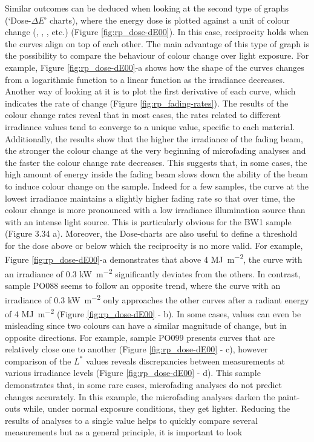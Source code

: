 Similar outcomes can be deduced when looking at the second type of graphs (‘Dose-$\Delta E$’ charts), where the energy dose is plotted against a unit of colour change (\dEOO, \dEab, \dR, etc.) (Figure \ref{fig:rp_dose-dE00}). In this case, reciprocity holds when the curves align on top of each other. The main advantage of this type of graph is the possibility to compare the behaviour of colour change over light exposure. For example, Figure \ref{fig:rp_dose-dE00}-a shows how the shape of the curves changes from a logarithmic function to a linear function as the irradiance decreases. Another way of looking at it is to plot the first derivative of each curve, which indicates the rate of change (Figure \ref{fig:rp_fading-rates}). The results of the colour change rates reveal that in most cases, the rates related to different irradiance values tend to converge to a unique value, specific to each material. Additionally, the results show that the higher the irradiance of the fading beam, the stronger the colour change at the very beginning of microfading analyses and the faster the colour change rate decreases. This suggests that, in some cases, the high amount of energy inside the fading beam slows down the ability of the beam to induce colour change on the sample. Indeed for a few samples, the curve at the lowest irradiance maintains a slightly higher fading rate so that over time, the colour change is more pronounced with a low irradiance illumination source than with an intense light source. This is particularly obvious for the BW1 sample (Figure 3.34 a). Moreover, the Dose-\dE charts are also useful to define a threshold for the dose above or below which the reciprocity is no more valid. For example, Figure \ref{fig:rp_dose-dE00}-a demonstrates that above 4 \unit{\mega\joule\per\square\metre}, the curve with an irradiance of 0.3 \unit{\kilo\watt\per\square\metre} significantly deviates from the others. In contrast, sample PO088 seems to follow an opposite trend, where the curve with an irradiance of 0.3 \unit{\kilo\watt\per\square\metre} only approaches the other curves after a radiant energy of 4 \unit{\mega\joule\per\square\metre} (Figure \ref{fig:rp_dose-dE00} - b). In some cases, \dE values can even be misleading since two colours can have a similar magnitude of change, but in opposite directions. For example, sample PO099 presents \dEOO curves that are relatively close one to another (Figure \ref{fig:rp_dose-dE00} - c), however comparison of the $L^*$ values reveals discrepancies between measurements at various irradiance levels (Figure \ref{fig:rp_dose-dE00} - d). This sample demonstrates that, in some rare cases, microfading analyses do not predict changes accurately. In this example, the microfading analyses darken the paint-outs while, under normal exposure conditions, they get lighter. Reducing the results of analyses to a single value helps to quickly compare several measurements but as a general principle, it is important to look 